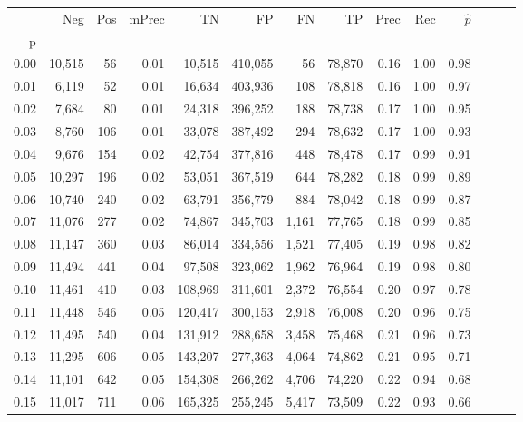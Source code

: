 \begin{tabular}{rrrrrrrrrrrrrr}
\toprule
{} &     Neg &    Pos & mPrec &       TN &       FP &      FN &      TP &  Prec &   Rec & $\hat{p}$ \\
p    &         &        &       &          &          &         &         &       &       &           \\
\midrule
0.00 &  10,515 &     56 &  0.01 &   10,515 &  410,055 &      56 &  78,870 &  0.16 &  1.00 &      0.98 \\
0.01 &   6,119 &     52 &  0.01 &   16,634 &  403,936 &     108 &  78,818 &  0.16 &  1.00 &      0.97 \\
0.02 &   7,684 &     80 &  0.01 &   24,318 &  396,252 &     188 &  78,738 &  0.17 &  1.00 &      0.95 \\
0.03 &   8,760 &    106 &  0.01 &   33,078 &  387,492 &     294 &  78,632 &  0.17 &  1.00 &      0.93 \\
0.04 &   9,676 &    154 &  0.02 &   42,754 &  377,816 &     448 &  78,478 &  0.17 &  0.99 &      0.91 \\
0.05 &  10,297 &    196 &  0.02 &   53,051 &  367,519 &     644 &  78,282 &  0.18 &  0.99 &      0.89 \\
0.06 &  10,740 &    240 &  0.02 &   63,791 &  356,779 &     884 &  78,042 &  0.18 &  0.99 &      0.87 \\
0.07 &  11,076 &    277 &  0.02 &   74,867 &  345,703 &   1,161 &  77,765 &  0.18 &  0.99 &      0.85 \\
0.08 &  11,147 &    360 &  0.03 &   86,014 &  334,556 &   1,521 &  77,405 &  0.19 &  0.98 &      0.82 \\
0.09 &  11,494 &    441 &  0.04 &   97,508 &  323,062 &   1,962 &  76,964 &  0.19 &  0.98 &      0.80 \\
0.10 &  11,461 &    410 &  0.03 &  108,969 &  311,601 &   2,372 &  76,554 &  0.20 &  0.97 &      0.78 \\
0.11 &  11,448 &    546 &  0.05 &  120,417 &  300,153 &   2,918 &  76,008 &  0.20 &  0.96 &      0.75 \\
0.12 &  11,495 &    540 &  0.04 &  131,912 &  288,658 &   3,458 &  75,468 &  0.21 &  0.96 &      0.73 \\
0.13 &  11,295 &    606 &  0.05 &  143,207 &  277,363 &   4,064 &  74,862 &  0.21 &  0.95 &      0.71 \\
0.14 &  11,101 &    642 &  0.05 &  154,308 &  266,262 &   4,706 &  74,220 &  0.22 &  0.94 &      0.68 \\
0.15 &  11,017 &    711 &  0.06 &  165,325 &  255,245 &   5,417 &  73,509 &  0.22 &  0.93 &      0.66 \\

\end{tabular}
